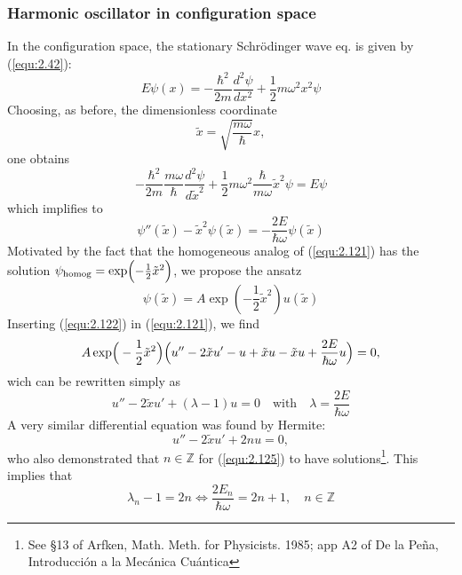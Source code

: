 \subsubsection{Harmonic oscillator in configuration space}
In the configuration space, the stationary Schrödinger wave
eq. is given by (\ref{equ:2.42}):
$$
E\psi(x) = - \frac{\hbar^2}{2m} \frac{d^2 \psi}{dx^2} +
\frac{1}{2}m\omega^2 x^2 \psi
$$
Choosing, as before, the dimensionless coordinate
\begin{equation}
  \tilde{x} = \sqrt{\frac{m\omega}{\hbar}} x,
  \label{equ:2.120}
\end{equation}
one obtains
$$
-\frac{\hbar^2}{2m} \frac{m\omega}{\hbar} \frac{d^2 \psi}{d
\tilde{x}^2} + \frac{1}{2} m \omega^2 \frac{\hbar}{m\omega}
\tilde{x}^2 \psi = E\psi
$$
which implifies to
\begin{equation}
  \psi'' (\tilde{x}) - \tilde{x}^2 \psi(\tilde{x}) = -
  \frac{2E}{\hbar\omega} \psi(\tilde{x})
  \label{equ:2.121}
\end{equation}
Motivated by the fact that the homogeneous analog of
(\ref{equ:2.121}) has the solution $\psi_{\text{homog}} =
\exp\Bigl(-\frac{1}{2}\tilde{x}^2\Bigr)$, we propose the
ansatz
\begin{equation}
  \psi(\tilde{x}) = A \exp(-\frac{1}{2}\tilde{x}^2)
  u(\tilde{x})
  \label{equ:122}
\end{equation}
Inserting (\ref{equ:2.122}) in (\ref{equ:2.121}), we find
\begin{equation}
  A \exp\Bigr(-\frac{1}{2}\tilde{x}^2\Bigl) \Bigl(
  u'' - 2\tilde{x}u'-u+\tilde{x}u-\tilde{x}u +
  \frac{2E}{\hbar\omega}u
  \Bigr) = 0,
  \label{equ:2.123}
\end{equation}
wich can be rewritten simply as
\begin{equation}
  u'' - 2\tilde{x}u' + (\lambda -1)u = 0 \quad \text{with}
  \quad \lambda = \frac{2E}{\hbar\omega}
  \label{equ:2.124}
\end{equation}
A very similar differential equation was found by Hermite:
\begin{equation}
  u'' - 2\tilde{x}u' + 2nu = 0,
  \label{equ:2.125}
\end{equation}
who also demonstrated that $n \in \mathbb{Z}$ for
(\ref{equ:2.125}) to have solutions\footnote{See \S 13 of
Arfken, Math. Meth. for Physicists. 1985; app A2 of De la
Peña, Introducción a la Mecánica Cuántica}.
This implies that
\begin{equation}
  \lambda_n - 1 = 2n \Leftrightarrow
  \frac{2E_n}{\hbar\omega} = 2n+1,\quad n \in \mathbb{Z}
  \label{equ:2.125}
\end{equation}
